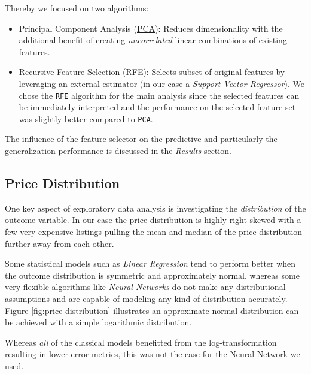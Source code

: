 Thereby we focused on two algorithms:
\begin{itemize}
    \item Principal Component Analysis (\href{https://scikit-learn.org/stable/modules/generated/sklearn.decomposition.PCA.html}{PCA}):
          Reduces dimensionality with the additional benefit of creating \emph{uncorrelated} linear combinations of existing features.
    \item Recursive Feature Selection (\href{https://scikit-learn.org/stable/modules/generated/sklearn.feature_selection.RFE.html}{RFE}):
          Selects subset of original features by leveraging an external estimator (in our case a \emph{Support Vector Regressor}).
          We chose the \texttt{RFE} algorithm for the main analysis since the selected features can be immediately interpreted and the performance on the selected feature set was slightly better compared to \texttt{PCA}.

\end{itemize}

The influence of the feature selector on the predictive and particularly the generalization performance is discussed in the \emph{Results} section.

\subsection{Price Distribution} \label{appendix:price-distribution}

One key aspect of exploratory data analysis is investigating the \emph{distribution} of the outcome variable.
In our case the price distribution is highly right-skewed with a few very expensive listings pulling the mean and median of the price distribution further away from each other.

Some statistical models such as \emph{Linear Regression} tend to perform better when the outcome distribution is symmetric and approximately normal, whereas some very flexible algorithms like \emph{Neural Networks} do not make any distributional assumptions and are capable of modeling any kind of distribution accurately.
Figure \ref{fig:price-distribution} illustrates an approximate normal distribution can be achieved with a simple logarithmic distribution.

Whereas \emph{all} of the classical models benefitted from the log-transformation resulting in lower error metrics, this was not the case for the Neural Network we used.

